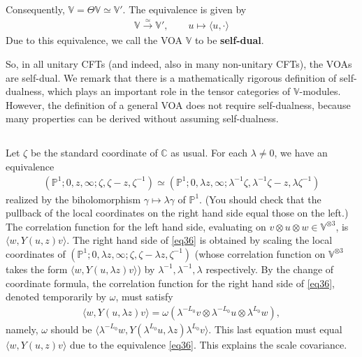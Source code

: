 \documentclass[11pt,b5paper,notitlepage]{article}
\theoremstyle{definition}
\theoremstyle{plain}
\newcommand{\bk}[1]{\langle {#1}\rangle}
\newcommand{\Vbb}{\mathbb V}
\newcommand{\Cbb}{\mathbb C}
\newcommand{\Pbb}{\mathbb P}
\numberwithin{equation}{section}
\begin{document}
Consequently, $\Vbb=\Theta\Vbb\simeq\Vbb'$. The equivalence is given by
\begin{align}
	\Vbb\xrightarrow{\simeq}\Vbb',\qquad u\mapsto \bk{u,\cdot}	
\end{align}
Due to this equivalence, we call the VOA $\Vbb$ to be \textbf{self-dual}.	


So, in all unitary CFTs (and indeed, also in many non-unitary CFTs), the VOAs are self-dual. We remark that there is a mathematically rigorous definition of self-dualness, which plays an important role in the tensor categories of $\Vbb$-modules. However, the definition of a general VOA does not require self-dualness, because many properties can be derived without assuming self-dualness.



\subsection{}\label{lb31}


Let $\zeta$ be the standard coordinate of $\Cbb$ as usual. For each $\lambda\neq0$, we have an equivalence
\begin{align}
(\Pbb^1;0,z,\infty;\zeta,\zeta-z,\zeta^{-1})\simeq (\Pbb^1;0,\lambda z,\infty;\lambda^{-1}\zeta,\lambda^{-1}\zeta-z,\lambda\zeta^{-1})\label{eq36}
\end{align}
realized by the biholomorphism $\gamma\mapsto \lambda\gamma$ of $\Pbb^1$. (You should check that the pullback of the local coordinates on the right hand side equal those on the left.) The correlation function for the left hand side, evaluating on $v\otimes u\otimes w\in\Vbb^{\otimes 3}$, is $\bk{w,Y(u,z)v}$. The right hand side of \eqref{eq36} is obtained by scaling the local coordinates of $(\Pbb^1;0,\lambda z,\infty;\zeta,\zeta-\lambda z,\zeta^{-1})$ (whose correlation function on $\Vbb^{\otimes 3}$ takes the form $\bk{w,Y(u,\lambda z)v}$) by $\lambda^{-1},\lambda^{-1},\lambda$ respectively. By the change of coordinate formula, the correlation function for the right hand side of \eqref{eq36}, denoted temporarily by $\omega$, must satisfy
\begin{align*}
\bk{w,Y(u,\lambda z)v}=\omega(\lambda^{-L_0}v\otimes \lambda^{-L_0}u\otimes\lambda^{L_0}w),	
\end{align*}
namely, $\omega$ should be $\bk{\lambda^{-L_0}w,Y(\lambda^{L_0}u,\lambda z)\lambda^{L_0}v}$. This last equation must equal  $\bk{w,Y(u,z)v}$ due to the equivalence \eqref{eq36}. This explains the scale covariance.
\end{document}
